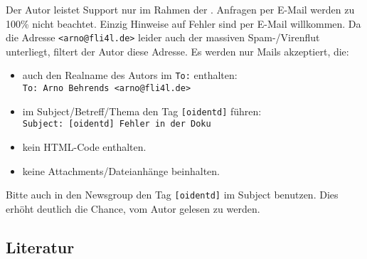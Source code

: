 Der Autor leistet Support nur im Rahmen der . Anfragen per \mbox{E-Mail} werden zu 100\% nicht beachtet. Einzig Hinweise
auf Fehler sind per \mbox{E-Mail} willkommen. Da die Adresse \texttt{<arno@fli4l.de>}
leider auch der massiven Spam-/Virenflut unterliegt, filtert der Autor diese
Adresse.  Es werden nur Mails akzeptiert, die:
\begin{itemize}
 \item auch den Realname des Autors im \texttt{To:} enthalten: \\
       \texttt{To: Arno Behrends <arno@fli4l.de>}
 \item im Subject/\/Betreff/\/Thema den Tag \texttt{[oidentd]} führen: \\
       \texttt{Subject: [oidentd] Fehler in der Doku}
 \item kein HTML-Code enthalten.
 \item keine Attachments/Dateianhänge beinhalten.
\end{itemize}
Bitte auch in den Newsgroup den Tag \texttt{[oidentd]} im Subject benutzen. Dies
erhöht deutlich die Chance, vom Autor gelesen zu werden.


\subsection{Literatur}






